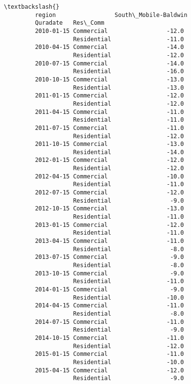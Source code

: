 \documentclass[11pt]{article}
\begin{document}
\begin{Verbatim}[commandchars=\\\{\}]
                                                      \textbackslash{}
         region                 South\_Mobile-Baldwin   
         Quradate   Res\_Comm                           
         2010-01-15 Commercial                 -12.0   
                    Residential                -11.0   
         2010-04-15 Commercial                 -14.0   
                    Residential                -12.0   
         2010-07-15 Commercial                 -14.0   
                    Residential                -16.0   
         2010-10-15 Commercial                 -13.0   
                    Residential                -13.0   
         2011-01-15 Commercial                 -12.0   
                    Residential                -12.0   
         2011-04-15 Commercial                 -11.0   
                    Residential                -11.0   
         2011-07-15 Commercial                 -11.0   
                    Residential                -12.0   
         2011-10-15 Commercial                 -13.0   
                    Residential                -14.0   
         2012-01-15 Commercial                 -12.0   
                    Residential                -12.0   
         2012-04-15 Commercial                 -10.0   
                    Residential                -11.0   
         2012-07-15 Commercial                 -12.0   
                    Residential                 -9.0   
         2012-10-15 Commercial                 -13.0   
                    Residential                -11.0   
         2013-01-15 Commercial                 -12.0   
                    Residential                -11.0   
         2013-04-15 Commercial                 -11.0   
                    Residential                 -8.0   
         2013-07-15 Commercial                  -9.0   
                    Residential                 -8.0   
         2013-10-15 Commercial                  -9.0   
                    Residential                -11.0   
         2014-01-15 Commercial                  -9.0   
                    Residential                -10.0   
         2014-04-15 Commercial                 -11.0   
                    Residential                 -8.0   
         2014-07-15 Commercial                 -11.0   
                    Residential                 -9.0   
         2014-10-15 Commercial                 -11.0   
                    Residential                -12.0   
         2015-01-15 Commercial                 -11.0   
                    Residential                -10.0   
         2015-04-15 Commercial                 -12.0   
                    Residential                 -9.0   

\end{Verbatim}
\end{document}
